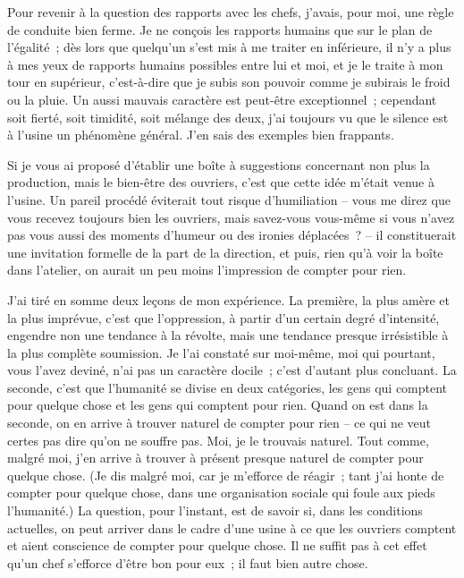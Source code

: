 \documentclass[french,twoside]{book} %
\begin{document}
Pour revenir à la question des rapports avec les chefs, j'avais, pour moi, une règle de conduite bien ferme. Je ne conçois les rapports humains que sur le plan de l'égalité ; dès lors que quelqu'un s'est mis à me traiter en inférieure, il n'y a plus à mes yeux de rapports humains possibles entre lui et moi, et je le traite à mon tour en supérieur, c'est-à-dire que je subis son pouvoir comme je subirais le froid ou la pluie. Un aussi mauvais caractère est peut-être exceptionnel ; cependant soit fierté, soit timidité, soit mélange des deux, j'ai toujours vu que le silence est à l'usine un phénomène général. J'en sais des exemples bien frappants.\par
Si je vous ai proposé d'établir une boîte à suggestions concernant non plus la production, mais le bien-être des ouvriers, c'est que cette idée m'était venue à l'usine. Un pareil procédé éviterait tout risque d'humiliation – vous me direz que vous recevez toujours bien les ouvriers, mais savez-vous vous-même si vous n'avez pas vous aussi des moments d'humeur ou des ironies déplacées ? – il constituerait une invitation formelle de la part de la direction, et puis, rien qu'à voir la boîte dans l'atelier, on aurait un peu moins l'impression de compter pour rien.\par
J'ai tiré en somme deux leçons de mon expérience. La première, la plus amère et la plus imprévue, c'est que l'oppression, à partir d'un certain degré d'intensité, engendre non une tendance à la révolte, mais une tendance presque irrésistible à la plus complète soumission. Je l'ai constaté sur moi-même, moi qui pourtant, vous l'avez deviné, n'ai pas un caractère docile ; c'est d'autant plus concluant. La seconde, c'est que l'humanité se divise en deux catégories, les gens qui comptent pour quelque chose et les gens qui comptent pour rien. Quand on est dans la seconde, on en arrive à trouver naturel de compter pour rien – ce qui ne veut certes pas dire qu'on ne souffre pas. Moi, je le trouvais naturel. Tout comme, malgré moi, j'en arrive à trouver à présent presque naturel de compter pour quelque chose. (Je dis malgré moi, car je m'efforce de réagir ; tant j'ai honte de compter pour quelque chose, dans une organisation sociale qui foule aux pieds l'humanité.) La question, pour l'instant, est de savoir si, dans les conditions actuelles, on peut arriver dans le cadre d'une usine à ce que les ouvriers comptent et aient conscience de compter pour quelque chose. Il ne suffit pas à cet effet qu'un chef s'efforce d'être bon pour eux ; il faut bien autre chose.\par
\end{document}
